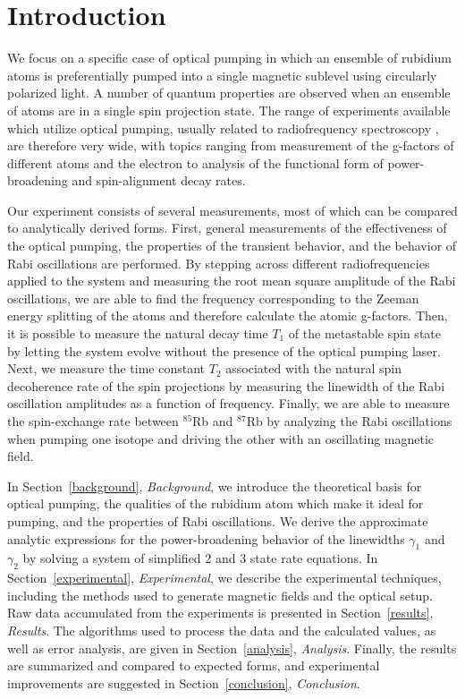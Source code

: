 
\section{Introduction}\label{introduction}

We focus on a specific case of optical pumping in which an ensemble of rubidium atoms is preferentially pumped into a single magnetic sublevel using circularly polarized light. A number of quantum properties are observed when an ensemble of atoms are in a single spin projection state. The range of experiments available which utilize optical pumping, usually related to radiofrequency spectroscopy \cite{bloom}, are therefore very wide, with topics ranging from measurement of the g-factors of different atoms and the electron to analysis of the functional form of power-broadening and spin-alignment decay rates.

Our experiment consists of several measurements, most of which can be compared to analytically derived forms. First, general measurements of the effectiveness of the optical pumping, the properties of the transient behavior, and the behavior of Rabi oscillations are performed. By stepping across different radiofrequencies applied to the system and measuring the root mean square amplitude of the Rabi oscillations, we are able to find the frequency corresponding to the Zeeman energy splitting of the atoms and therefore calculate the atomic g-factors. Then, it is possible to measure the natural decay time $T_{1}$ of the metastable spin state by letting the system evolve without the presence of the optical pumping laser. Next, we measure the time constant $T_{2}$ associated with the natural spin decoherence rate of the spin projections by measuring the linewidth of the Rabi oscillation amplitudes as a function of frequency. Finally, we are able to measure the spin-exchange rate between $^{85}$Rb and $^{87}$Rb by analyzing the Rabi oscillations when pumping one isotope and driving the other with an oscillating magnetic field.

In Section~\ref{background}, \emph{Background}, we introduce the theoretical basis for optical pumping, the qualities of the rubidium atom which make it ideal for pumping, and the properties of Rabi oscillations. We derive the approximate analytic expressions for the power-broadening behavior of the linewidths $\gamma_{1}$ and $\gamma_{2}$ by solving a system of simplified 2 and 3 state rate equations. In Section~\ref{experimental}, \emph{Experimental}, we describe the experimental techniques, including the methods used to generate magnetic fields and the optical setup. Raw data accumulated from the experiments is presented in Section~\ref{results}, \emph{Results}. The algorithms used to process the data and the calculated values, as well as error analysis, are given in Section~\ref{analysis}, \emph{Analysis}. Finally, the results are summarized and compared to expected forms, and experimental improvements are suggested in Section~\ref{conclusion}, \emph{Conclusion}.